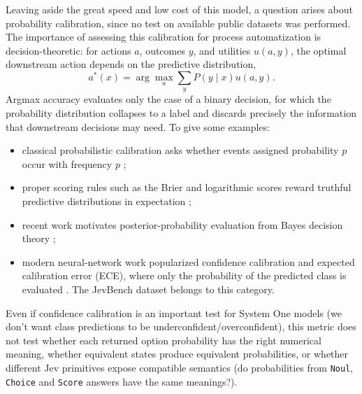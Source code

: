 \documentclass[twoside]{article}
\begin{document}
Leaving aside the great speed and low cost of this model, a question arises about probability calibration, since no test on available public datasets was performed.
The importance of assessing this calibration for process automatization is decision-theoretic: for actions $a$, outcomes $y$, and utilities $u(a,y)$, the optimal downstream action depends on the predictive distribution,
\[
  a^*(x)=\arg\max_a \sum_y P(y\mid x)u(a,y).
\]
Argmax accuracy evaluates only the case of a binary decision, for which the probability distribution collapses to a label and discards precisely the information that downstream decisions may need.
To give some examples:
\begin{itemize}
    \item classical probabilistic calibration asks whether events assigned probability $p$ occur with frequency $p$ \cite{dawid1982wellcalibrated};
    \item proper scoring rules such as the Brier and logarithmic scores reward truthful predictive distributions in expectation \cite{brier1950verification,gneiting2007proper};
    \item recent work motivates posterior-probability evaluation from Bayes decision theory \cite{ferrer2024posterior};
    \item modern neural-network work popularized confidence calibration and expected calibration error (ECE), where only the probability of the predicted class is evaluated \cite{guo2017calibration}. The JevBench dataset \cite{jevbench_github} belongs to this category.
\end{itemize}

Even if confidence calibration is an important test for System One models (we don't want class predictions to be underconfident/overconfident), this metric does not test whether each returned option probability has the right numerical meaning, whether equivalent states produce equivalent probabilities, or whether different Jev primitives expose compatible semantics (do probabilities from \texttt{Noul}, \texttt{Choice} and \texttt{Score} answers have the same meanings?).
\end{document}
